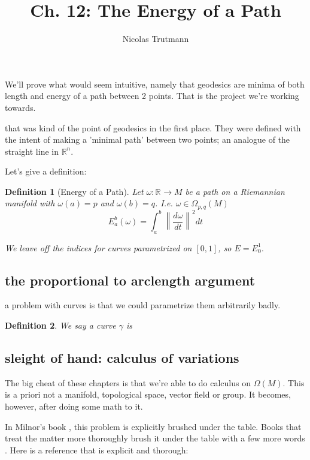 \documentclass{article}
\title{Ch. 12: The Energy of a Path}
\author{Nicolas Trutmann}
\date{}
\newtheorem{def}{Definition}
\renewcommand{\Rn}[1][n]{\mathbb{R}^{#1}}
\newcommand{\Absbars}[1]{\left\lVert#1\right\rVert}
\newcommand{\rmfd}[1]{Riemannian manifold}
\begin{document}
\maketitle


We'll prove what would seem intuitive, namely that geodesics are minima of both length and energy of
a path between 2 points. That is the project we're working towards.

that was kind of the point of geodesics in the first place. They were defined with the intent of
making a 'minimal path' between two points; an analogue of the straight line in $\Rn$.

Let's give a definition:

\begin{def}[Energy of a Path]
Let $\omega : \Rn[] \rightarrow M $ be a path on a \rmfd, with $\omega(a) = p$ and $\omega(b) = q$.
I.e. $\omega \in \Omega_{p,q}(M)$
\[ E_a^b(\omega) = \int_a^b \Absbars{\frac{d\omega}{dt}}^2 dt \]

We leave off the indices for curves parametrized on $[0,1]$, so $E = E_0^1$.
\end{def}

\subsection{the proportional to arclength argument}

a problem with curves is that we could parametrize them arbitrarily badly.

\begin{def}
    \label{def:reparametrization}
    We say a curve $\gamma$ is
\end{def}





\subsection{sleight of hand: calculus of variations}

\newcommand{\OM}{\Omega(M)}
The big cheat of these chapters is that we're able to do calculus on $\OM$.
This is a priori not a manifold, topological space, vector field or group.
It becomes, however, after doing some math to it.

In Milnor's book \cite{milnor}, this problem is explicitly brushed under the table.
Books that treat the matter more thoroughly brush it under the table with a few more words
\cite{salamon}.
Here is a reference that is explicit and thorough: \cite{lee}
\end{document}
